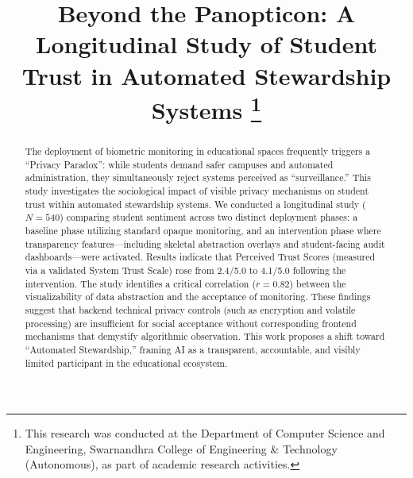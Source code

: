 \documentclass[conference]{IEEEtran}
\begin{document}
\title{Beyond the Panopticon: A Longitudinal Study of Student Trust in Automated Stewardship Systems
\thanks{This research was conducted at the Department of Computer Science and Engineering, Swarnandhra College of Engineering \& Technology (Autonomous), as part of academic research activities.}
}

\author{
}

\maketitle

\begin{abstract}
The deployment of biometric monitoring in educational spaces frequently triggers a ``Privacy Paradox'': while students demand safer campuses and automated administration, they simultaneously reject systems perceived as ``surveillance.'' This study investigates the sociological impact of visible privacy mechanisms on student trust within automated stewardship systems. We conducted a longitudinal study ($N=540$) comparing student sentiment across two distinct deployment phases: a baseline phase utilizing standard opaque monitoring, and an intervention phase where transparency features---including skeletal abstraction overlays and student-facing audit dashboards---were activated. Results indicate that Perceived Trust Scores (measured via a validated System Trust Scale) rose from 2.4/5.0 to 4.1/5.0 following the intervention. The study identifies a critical correlation ($r=0.82$) between the visualizability of data abstraction and the acceptance of monitoring. These findings suggest that backend technical privacy controls (such as encryption and volatile processing) are insufficient for social acceptance without corresponding frontend mechanisms that demystify algorithmic observation. This work proposes a shift toward ``Automated Stewardship,'' framing AI as a transparent, accountable, and visibly limited participant in the educational ecosystem.
\end{abstract}
\end{document}
